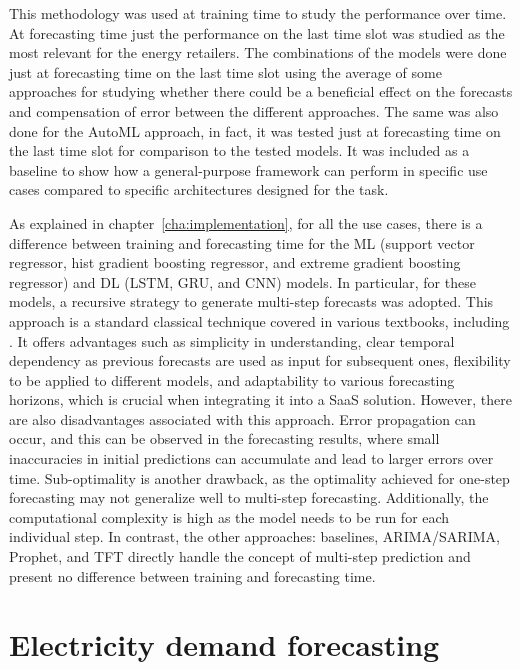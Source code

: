 This methodology was used at training time to study the performance over time.
At forecasting time just the performance on the last time slot was studied as the most relevant for the energy retailers.
The combinations of the models were done just at forecasting time on the last time slot using the average of some approaches for studying whether there could be a beneficial effect on the forecasts and compensation of error between the different approaches.
The same was also done for the AutoML approach, in fact, it was tested just at forecasting time on the last time slot for comparison to the tested models.
It was included as a baseline to show how a general-purpose framework can perform in specific use cases compared to specific architectures designed for the task.

As explained in chapter~\ref{cha:implementation}, for all the use cases, there is a difference between training and forecasting time for the ML (support vector regressor, hist gradient boosting regressor, and extreme gradient boosting regressor) and DL (LSTM, GRU, and CNN) models.
In particular, for these models, a recursive strategy to generate multi-step forecasts was adopted.
This approach is a standard classical technique covered in various textbooks, including \cite{Manu2022}.
It offers advantages such as simplicity in understanding, clear temporal dependency as previous forecasts are used as input for subsequent ones, flexibility to be applied to different models, and adaptability to various forecasting horizons, which is crucial when integrating it into a SaaS solution.
However, there are also disadvantages associated with this approach.
Error propagation can occur, and this can be observed in the forecasting results, where small inaccuracies in initial predictions can accumulate and lead to larger errors over time.
Sub-optimality is another drawback, as the optimality achieved for one-step forecasting may not generalize well to multi-step forecasting.
Additionally, the computational complexity is high as the model needs to be run for each individual step.
In contrast, the other approaches: baselines, ARIMA/SARIMA, Prophet, and TFT directly handle the concept of multi-step prediction and present no difference between training and forecasting time.


\section{Electricity demand forecasting}
\label{sec:demandval}
\vspace{0.2 cm}

